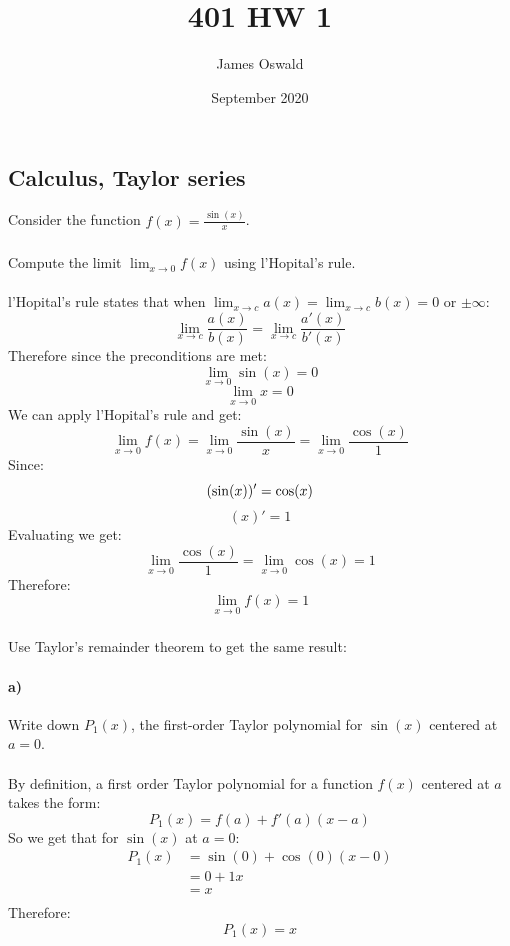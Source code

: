 \documentclass{article}
\title{401 HW 1}
\author{James Oswald}
\date{September 2020}
\begin{document}
\maketitle

\section{}
\subsection{Calculus, Taylor series}
Consider the function $f(x)=\frac{\sin(x)}{x}$.
\subsubsection{}
Compute the limit $\lim_{x\to0}f(x)$ using l’Hopital’s rule.
\\\\
\newline
l’Hopital’s rule states that when $\lim_{x\to c}a(x) = \lim_{x\to c}b(x) = 0$ or $\pm\infty$:
\[\lim_{x\to c}\frac{a(x)}{b(x)} = \lim_{x\to c}\frac{a'(x)}{b'(x)}\]
Therefore since the preconditions are met:
\[\lim_{x\to 0}\sin(x) = 0\]
\[\lim_{x\to 0} x = 0\]
We can apply l’Hopital’s rule and get:
\[\lim_{x\to 0}f(x)=\lim_{x\to 0}\frac{\sin(x)}{x}=\lim_{x\to 0}\frac{\cos(x)}{1}\]
Since:
\[(\sin(x))' = \cos(x) \newline\]
\[(x)' = 1\]
Evaluating we get:
\[\lim_{x\to 0}\frac{\cos(x)}{1} = \lim_{x\to 0}\cos(x) = 1\]
Therefore:
\[\lim_{x\to0}f(x) = 1\]

\subsubsection{}
Use Taylor’s remainder theorem to get the same result:
\paragraph{a)} Write down $P_1(x)$, the first-order Taylor polynomial for $\sin(x)$ centered at $a = 0$.
\\\\
By definition, a first order Taylor polynomial for a function $f(x)$ centered at $a$ takes the form:
\[P_1(x) = f(a) + f'(a)(x-a)\]
So we get that for $\sin(x)$ at $a = 0$:
\begin{equation}
\begin{aligned}
P_1(x) &= \sin(0) + \cos(0)(x - 0) \\
&= 0 + 1x \\
&= x\\
\nonumber
\end{aligned}
\end{equation}
Therefore:
\[P_1(x) = x\] 
\end{document}
